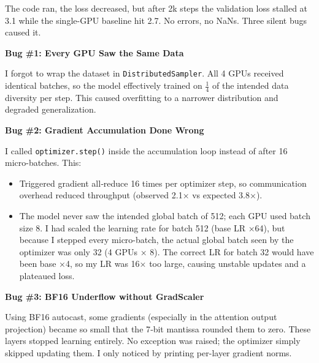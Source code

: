 \documentclass[11pt]{article}
\begin{document}
\vspace{0.2in}

{\large\color{brandgray}
The code ran, the loss decreased, but after 2k steps the validation loss stalled at 3.1 while the single-GPU baseline hit 2.7. No errors, no NaNs. Three silent bugs caused it.
}

\vspace{0.15in}

\begin{darkbox}
{\large\textbf{Bug \#1: Every GPU Saw the Same Data}}

\vspace{0.05in}
I forgot to wrap the dataset in \texttt{DistributedSampler}. All 4 GPUs received identical batches, so the model effectively trained on $\frac{1}{4}$ of the intended data diversity per step. This caused overfitting to a narrower distribution and degraded generalization.
\end{darkbox}

\vspace{0.15in}

\begin{darkbox}
{\large\textbf{Bug \#2: Gradient Accumulation Done Wrong}}

\vspace{0.05in}
I called \texttt{optimizer.step()} inside the accumulation loop instead of after 16 micro-batches. This:
\begin{itemize}[leftmargin=*, itemsep=0.06in, label={\color{brandblue}\textbullet}]
    \item Triggered gradient all‑reduce 16 times per optimizer step, so communication overhead reduced throughput (observed 2.1× vs expected 3.8×).
    \item The model never saw the intended global batch of 512; each GPU used batch size 8. I had scaled the learning rate for batch 512 (base LR ×64), but because I stepped every micro-batch, the actual global batch seen by the optimizer was only 32 (4 GPUs × 8). The correct LR for batch 32 would have been base ×4, so my LR was 16× too large, causing unstable updates and a plateaued loss.
\end{itemize}

\end{darkbox}

\vspace{0.15in}

\begin{darkbox}
{\large\textbf{Bug \#3: BF16 Underflow without GradScaler}}

\vspace{0.05in}
Using BF16 autocast, some gradients (especially in the attention output projection) became so small that the 7‑bit mantissa rounded them to zero. These layers stopped learning entirely. No exception was raised; the optimizer simply skipped updating them. I only noticed by printing per-layer gradient norms.
\end{darkbox}
\end{document}
